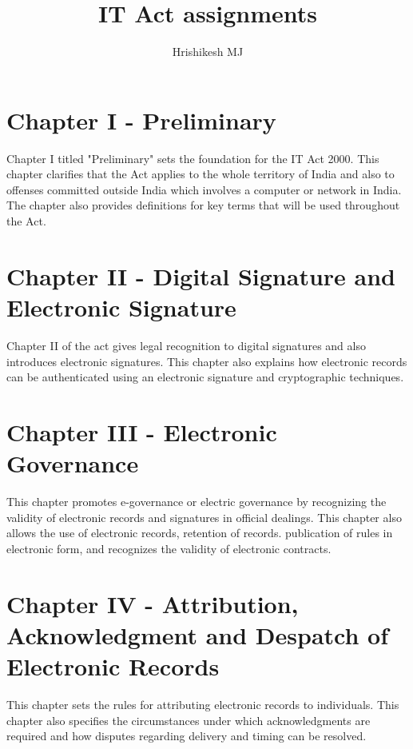 \documentclass{extreport}
\title{IT Act assignments}
\author{Hrishikesh MJ}
\date{}
\begin{document}
\maketitle


\section*{Chapter I - Preliminary}

\par Chapter I titled "Preliminary" sets the foundation for the IT Act 2000. This chapter clarifies that the Act applies to the whole territory of India and also to offenses committed outside India which involves a computer or network in India. The chapter also provides definitions for key terms that will be used throughout the Act.

\section*{Chapter II - Digital Signature and Electronic Signature}

\par Chapter II of the act gives legal recognition to digital signatures and also introduces electronic signatures. This chapter also explains how electronic records can be authenticated using an electronic signature and cryptographic techniques. 

\section*{Chapter III - Electronic Governance}

\par This chapter promotes e-governance or electric governance by recognizing the validity of electronic records and signatures in official dealings. This chapter also allows the use of electronic records, retention of records. publication of rules in electronic form, and recognizes the validity of electronic contracts.

\section*{Chapter IV - Attribution, Acknowledgment and Despatch of Electronic Records}

\par This chapter sets the rules for attributing electronic records to individuals. This chapter also specifies the circumstances under which acknowledgments are required and how disputes regarding delivery and timing can be resolved. 
\end{document}
